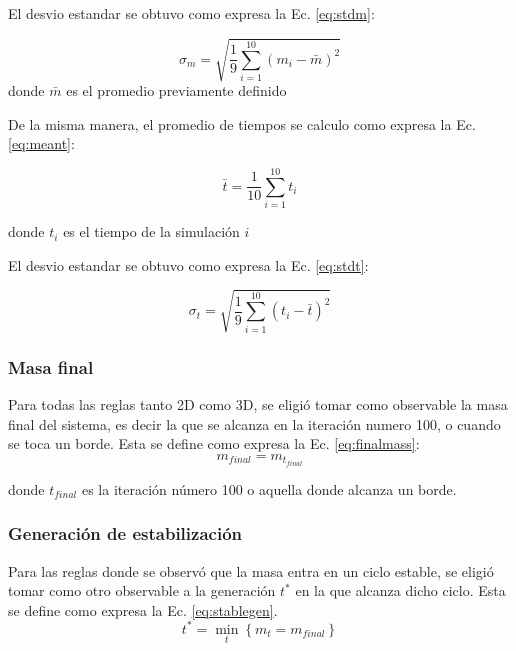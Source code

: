 El desvio estandar se obtuvo como expresa la Ec. \ref{eq:stdm}:

\begin{equation}
    \label{eq:stdm}
    \sigma_{m} = \sqrt{\frac{1}{9} \sum_{i=1}^{10} (m_i - \bar{m})^2}
\end{equation}
donde $\bar{m}$ es el promedio previamente definido

De la misma manera, el promedio de tiempos se calculo como expresa la Ec. \ref{eq:meant}:

\begin{equation}
    \label{eq:meant}
    \bar{t} = \frac{1}{10} \sum_{i=1}^{10} t_i
\end{equation}

donde $t_i$ es el tiempo de la simulación $i$

El desvio estandar se obtuvo como expresa la Ec. \ref{eq:stdt}:

\begin{equation}
    \label{eq:stdt}
    \sigma_{t} = \sqrt{\frac{1}{9} \sum_{i=1}^{10} (t_i - \bar{t})^2}
\end{equation}

\subsubsection{Masa final}
Para todas las reglas tanto 2D como 3D, se eligió tomar como observable la masa final del sistema, es decir la que se alcanza en la iteración numero 100, o cuando se toca un borde. Esta se define como expresa la Ec. \ref{eq:finalmass}:
\begin{equation}
    \label{eq:finalmass}
    m_{final} = m_{t_{final}}
\end{equation}

donde $t_{final}$ es la iteración número 100 o aquella donde alcanza un borde.

\subsubsection{Generación de estabilización}
Para las reglas donde se observó que la masa entra en un ciclo estable, se eligió tomar como otro observable a la generación $t^{*}$ en la que alcanza dicho ciclo. Esta se define como expresa la Ec. \ref{eq:stablegen}.
\begin{equation}
    \label{eq:stablegen}
    t^{*} = \min_{t}{\left\{ m_t = m_{final} \right\}}
\end{equation}